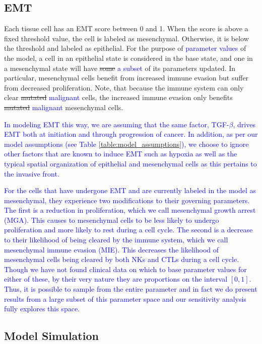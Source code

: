 \documentclass[11pt]{article}
\newcommand{\tcb} { \textcolor{blue} }
\begin{document}
\subsection{EMT}\label{EMT}
Each tissue cell has an EMT score between 0 and 1.
When the score is above a fixed threshold value, the cell is labeled as mesenchymal.
Otherwise, it is below the threshold and labeled as epithelial.
For the purpose of \tcb{parameter values} of the model, a cell in an epithelial state is considered in the base state, and one in a mesenchymal state will have \sout{some} \tcb{a subset} of its parameters updated.
In particular, mesenchymal cells benefit from increased immune evasion but suffer from decreased proliferation.
Note, that because the immune system can only clear \sout{mutated} \tcb{malignant} cells, the increased immune evasion only benefits \sout{mutated} \tcb{malignant} mesenchymal cells.
\par
\tcb{
In modeling EMT this way, we are assuming that the same factor, TGF-$\beta$, drives EMT both at initiation and through progression of cancer.
In addition, as per our model assumptions (see Table \ref{table:model_assumptions}), we choose to ignore other factors that are known to induce EMT such as hypoxia as well as the typical spatial organization of epithelial and mesenchymal cells as this pertains to the invasive front.
}
\par
\tcb{
For the cells that have undergone EMT and are currently labeled in the model as mesenchymal, they experience two modifications to their governing parameters.
The first is a reduction in proliferation, which we call mesenchymal growth arrest (MGA).
This causes to mesenchymal cells to be less likely to undergo proliferation and more likely to rest during a cell cycle.
The second is a decrease to their likelihood of being cleared by the immune system, which we call mesenchymal immune evasion (MIE). 
This decreases the likelihood of mesenchymal cells being cleared by both NKs and CTLs during a cell cycle.
Though we have not found clinical data on which to base parameter values for either of these, by their very nature they are proportions on the interval $[0,1]$.
Thus, it is possible to sample from the entire parameter and in fact we do present results from a large subset of this parameter space and our sensitivity analysis fully explores this space.
}
\subsection{Model Simulation}
\end{document}
